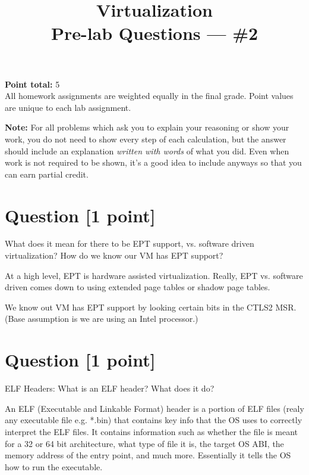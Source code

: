 \documentclass[11pt]{article}
\providecommand{\due}{}
\begin{document}
\title{Virtualization\\Pre-lab Questions --- \#2}
\date{\due}

\maketitle

\noindent \textbf{Point total:} 5
\\ All homework assignments are weighted equally in the final grade. Point values are unique to each lab assignment.

\textbf{Note:} For all problems which ask you to explain your reasoning or show your work, you do not need to show every step of each calculation, but the answer should include an explanation \emph{written with words} of what you did.  Even when work is not required to be shown, it’s a good idea to include anyways so that you can earn partial credit.

\section{Question [1 point]}

What does it mean for there to be EPT support, 
vs. software driven virtualization? 
How do we know our VM has EPT support?

\begin{solution}
At a high level, EPT is hardware assisted virtualization. Really, EPT vs. software 
driven comes down to using extended page tables or shadow page tables. 

We know out VM has EPT support by looking certain bits in the CTLS2 MSR. (Base assumption is 
we are using an Intel processor.)
\end{solution}


\section{Question [1 point]}

ELF Headers:
What is an ELF header? What does it do?

\begin{solution}
An ELF (Executable and Linkable Format) header is a portion of ELF files (realy any executable file e.g. *.bin) 
that contains key info that the OS uses to correctly interpret the ELF files. It contains information 
such as whether the file is meant for a 32 or 64 bit architecture, what type of file it is, the target OS ABI,
 the memory address of the entry point, and much more. Essentially it tells the OS how to run the executable. 
\end{solution}
\end{document}
